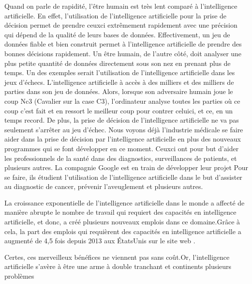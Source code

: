 \documentclass[letterpaper,10pt,french]{sphinxmanual}
\begin{document}
Quand on parle de rapidité, l’être humain est très lent comparé à l’intelligence
artificielle. En effet, l’utilisation de l’intelligence artificielle pour la prise
de décision permet de prendre ceux\sphinxhyphen{}ci extrêmement rapidement avec une précision qui
dépend de la qualité de leurs bases de données. Effectivement, un jeu de données fiable
et bien construit permet à l’intelligence artificielle de prendre des bonnes décisions
rapidement. Un être humain, de l’autre côté, doit analyser une plus petite quantité de
données directement sous son nez en prenant plus de temps. Un des exemples serait
l’utilisation de l’intelligence artificielle dans les jeux d’échecs. L’intelligence
artificielle à accès à des milliers et des milliers de parties dans son jeu de
données. Alors, lorsque son adversaire humain joue le coup  Nc3 (Cavalier sur la case C3),
l’ordinateur analyse toutes les parties où ce coup c’est fait et en ressort le meilleur
coup pour contrer celui\sphinxhyphen{}ci, et ce, en un temps record. De plus, la prise de décision de
l’intelligence artificielle ne va pas seulement s’arrêter au jeu d’échec. Nous voyons
déjà l’industrie médicale se faire aider dans la prise de décision par l’intelligence
artificielle en plus des nouveaux programmes qui se font développer en ce moment. Ceux\sphinxhyphen{}ci
ont pour but d’aider les professionnels de la santé dans des diagnostics, surveillances
de patients, et plusieurs autres. La compagnie Google est en train de développer  leur
projet  Pour se faire, ils étudient l’utilisation de l’intelligence artificielle
dans le but d’assister au diagnostic de cancer, prévenir l’aveuglement et plusieurs autres.

La croissance exponentielle de l’intelligence artificielle dans le monde a affecté
de manière abrupte le nombre de travail qui requiert des capacités en intelligence
artificielle, et donc, a créé plusieurs nouveaux emplois dans ce domaine.Grâce à cela,
la part des emplois qui requièrent des capacités en intelligence artificielle a augmenté
de 4,5 fois depuis 2013 aux États\sphinxhyphen{}Unis sur le site web .

Certes, ces merveilleux bénéfices ne viennent pas sans coût.Or, l’intelligence artificielle
s’avère à être une arme à double tranchant et continents plusieurs problèmes
\end{document}
